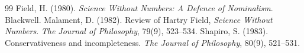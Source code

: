 \documentclass{situationist-preprint}
\begin{document}
\begin{thebibliography}{99}\small
{} Field, H. (1980). \emph{Science Without Numbers: A Defence of Nominalism}. Blackwell.
 Malament, D. (1982). Review of Hartry Field, \emph{Science Without Numbers}. \emph{The Journal of Philosophy}, 79(9), 523--534.
 Shapiro, S. (1983). Conservativeness and incompleteness. \emph{The Journal of Philosophy}, 80(9), 521--531.
\end{thebibliography}
\end{document}
